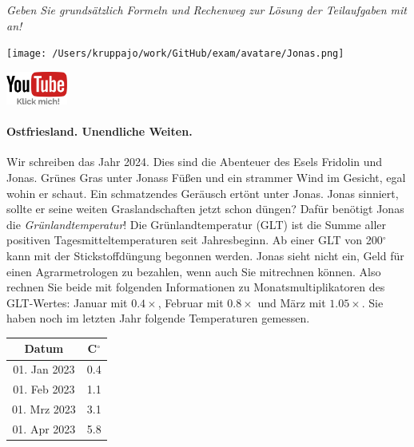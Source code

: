 \documentclass[a4paper, 9pt]{scrartcl}\usepackage[]{graphicx}\usepackage[]{xcolor}
\begin{document}
\textit{Geben Sie grundsätzlich Formeln und Rechenweg zur Lösung der Teilaufgaben mit an!} \\[1Ex]
 

 
\begin{minipage}[t]{0.5\textwidth}
\texttt{[image: /Users/kruppajo/work/GitHub/exam/avatare/Jonas.png]}
\end{minipage}
\begin{minipage}[t]{0.5\textwidth}
\hfill
\href{https://youtu.be/fiWGgCX-cE4}{\includegraphics[width = 2cm]{img/youtube}}
\end{minipage}






\paragraph{Ostfriesland. Unendliche Weiten.}



Wir schreiben das Jahr 2024. Dies sind die Abenteuer des Esels Fridolin und Jonas. Grünes Gras unter Jonass Füßen und ein strammer Wind im Gesicht, egal wohin er schaut. Ein schmatzendes Geräusch ertönt unter Jonas. Jonas sinniert, sollte er seine weiten Graslandschaften jetzt schon düngen? Dafür benötigt Jonas die \textit{Grünlandtemperatur}! Die Grünlandtemperatur (GLT) ist die Summe aller positiven Tagesmitteltemperaturen seit Jahresbeginn. Ab einer GLT von 200$^\circ$ kann mit der Stickstoffdüngung begonnen werden. Jonas sieht nicht ein, Geld für einen Agrarmetrologen zu bezahlen, wenn auch Sie mitrechnen können. Also rechnen Sie beide mit folgenden Informationen zu Monatsmultiplikatoren des GLT-Wertes: Januar mit $0.4\times$, Februar mit $0.8\times$ und März mit
$1.05\times$. Sie haben noch im letzten Jahr folgende Temperaturen gemessen.

\begin{center}
\begin{tabular}{cc}
  \toprule
  Datum & C$^\circ$ \\
  \midrule
  01. Jan 2023 & 0.4\\
  01. Feb 2023 & 1.1\\
  01. Mrz 2023 & 3.1\\
  01. Apr 2023 & 5.8\\
  \bottomrule
\end{tabular}
\end{center}
\end{document}
